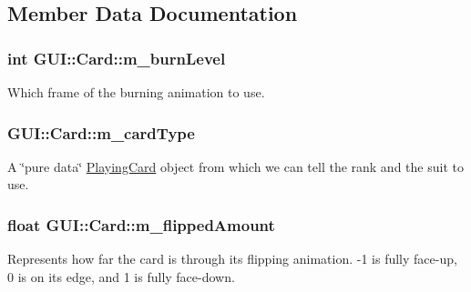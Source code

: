 \subsection{Member Data Documentation}
\hypertarget{classGUI_1_1Card_a5558831a2e8f343229fa9288a0e2a3d3}{
\subsubsection[{m\-\_\-burn\-Level}]{\setlength{\rightskip}{0pt plus 5cm}int G\-U\-I\-::\-Card\-::m\-\_\-burn\-Level\hspace{0.3cm}{\ttfamily [private]}}}\label{classGUI_1_1Card_a5558831a2e8f343229fa9288a0e2a3d3}


Which frame of the burning animation to use. 

\hypertarget{classGUI_1_1Card_a1823124410a8235ef0afbb0b51420f41}{
\subsubsection[{m\-\_\-card\-Type}]{ G\-U\-I\-::\-Card\-::m\-\_\-card\-Type\hspace{0.3cm}{\ttfamily [private]}}}\label{classGUI_1_1Card_a1823124410a8235ef0afbb0b51420f41}


A \char`\"{}pure data\char`\"{} \hyperlink{classPlayingCard}{Playing\-Card} object from which we can tell the rank and the suit to use. 

\hypertarget{classGUI_1_1Card_aae7758b01b93defe544558f4b8b4b976}{
\subsubsection[{m\-\_\-flipped\-Amount}]{\setlength{\rightskip}{0pt plus 5cm}float G\-U\-I\-::\-Card\-::m\-\_\-flipped\-Amount\hspace{0.3cm}{\ttfamily [private]}}}\label{classGUI_1_1Card_aae7758b01b93defe544558f4b8b4b976}


Represents how far the card is through its flipping animation. -\/1 is fully face-\/up, 0 is on its edge, and 1 is fully face-\/down. 

